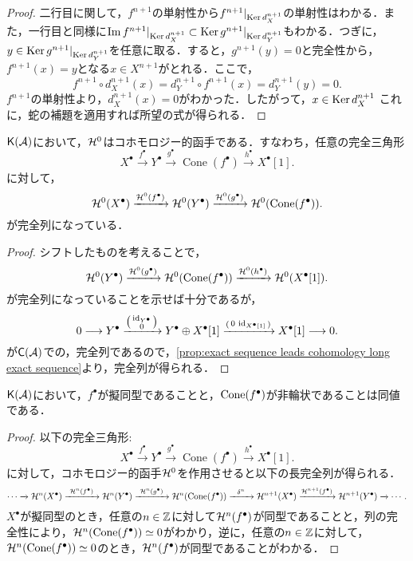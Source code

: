 \begin{proof}
二行目に関して，$f^{n+1}$の単射性から$f^{n+1}|_{\operatorname{Ker} d_X^{n+1}}$の単射性はわかる．また，一行目と同様に$\Im f^{n+1}|_{\operatorname{Ker} d_X^{n+1}} \subset \operatorname{Ker} g^{n+1}|_{\operatorname{Ker} d_Y^{n+1}}$もわかる．つぎに，$y\in\operatorname{Ker} g^{n+1}|_{\operatorname{Ker} d_Y^{n+1}}$を任意に取る．すると，$g^{n+1}(y)=0$と完全性から，$f^{n+1}(x)=y$となる$x\in X^{n+1}$がとれる．ここで，
\[f^{n+1}\circ d_X^{n+1}(x) = d_Y^{n+1}\circ f^{n+1}(x) = d_Y^{n+1}(y) = 0.\]
$f^{n+1}$の単射性より，$d_X^{n+1}(x)=0$がわかった．したがって，$x\in\operatorname{Ker} d_X^{n+1}$
	これに，蛇の補題を適用すれば所望の式が得られる．
\end{proof}

\begin{prop}
	$\mathsf{K}({\mathcal A})$において，${\mathcal H}^0$はコホモロジー的函手である．すなわち，任意の完全三角形
  \[
		X^\bullet \xrightarrow{f^\bullet} Y^\bullet \xrightarrow{g^\bullet} \operatorname{Cone}(f^\bullet) \xrightarrow{h^\bullet} X^\bullet[1].
  \]
	に対して，
  \[
		{\mathcal H}^0(X^\bullet)\xrightarrow{{\mathcal H}^0(f^\bullet)}{\mathcal H}^0(Y^\bullet)\xrightarrow{{\mathcal H}^0(g^\bullet)}{\mathcal H}^0(\operatorname{\mathrm{Cone}}(f^\bullet)).
  \]
	が完全列になっている．
\end{prop}
\begin{proof}
	シフトしたものを考えることで，
  \[
		{\mathcal H}^0(Y^\bullet)\xrightarrow{{\mathcal H}^0(g^\bullet)}{\mathcal H}^0(\operatorname{\mathrm{Cone}}(f^\bullet))\xrightarrow{{\mathcal H}^0(h^\bullet)}{\mathcal H}^0(X^\bullet[1]).
  \]
	が完全列になっていることを示せば十分であるが，
  \[
		0\longrightarrow Y^\bullet \xrightarrow{\left(\begin{smallmatrix}\mathrm{id}_{Y^\bullet}\\ 0\end{smallmatrix}\right)}Y^\bullet \oplus X^\bullet[1] \xrightarrow{\left(\begin{smallmatrix}0 & \mathrm{id}_{X^\bullet[1]}\end{smallmatrix}\right)} X^\bullet[1]\longrightarrow 0.
  \]
	が$\mathsf{C}({\mathcal A})$での，完全列であるので，\ref{prop:exact sequence leads cohomology long exact sequence}より，完全列が得られる．
\end{proof}
\begin{lemm}
	$\mathsf{K}({\mathcal A})$において，$f^\bullet$が擬同型であることと，$\operatorname{\mathrm{Cone}}(f^\bullet)$が非輪状であることは同値である．
\end{lemm}
\begin{proof}
以下の完全三角形:
  \[
		X^\bullet \xrightarrow{f^\bullet} Y^\bullet \xrightarrow{g^\bullet} \operatorname{Cone}(f^\bullet) \xrightarrow{h^\bullet} X^\bullet[1].
  \]
に対して，コホモロジー的函手${\mathcal H}^0$を作用させると以下の長完全列が得られる．
\[\cdots\xrightarrow{}\H^n(X^\bullet)\xrightarrow{\ \H^{n}(f^\bullet)\ } \H^n(Y^\bullet)\xrightarrow{\ \H^{n}(g^\bullet)\ } \H^n(\Cone(f^\bullet))\xrightarrow{\ \ \delta^n\ \ } \H^{n+1}(X^\bullet) \xrightarrow{\H^{n+1}(f^\bullet)} \H^{n+1}(Y^\bullet)\xrightarrow{}\cdots .\]
$X^\bullet$が擬同型のとき，任意の$n\in{\mathbb Z}$に対して${\mathcal H}^n(f^\bullet)$が同型であることと，列の完全性により，${\mathcal H}^n(\operatorname{\mathrm{Cone}}(f^\bullet))\simeq 0$がわかり，逆に，任意の$n\in{\mathbb Z}$に対して，${\mathcal H}^n(\operatorname{\mathrm{Cone}}(f^\bullet))\simeq 0$のとき，${\mathcal H}^n(f^\bullet)$が同型であることがわかる．
\end{proof}

